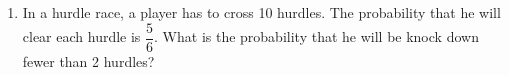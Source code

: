 \begin{enumerate}[label=\thechapter.\arabic*,ref=\thechapter.\theenumi]
\item In a hurdle race, a player has to cross 10 hurdles. The probability that he will clear each hurdle is $\dfrac{5}{6}$. What is the probability that he will be knock down fewer than 2 hurdles?
\end{enumerate}
